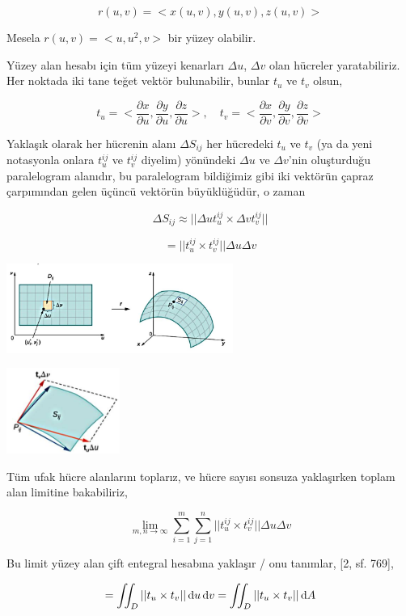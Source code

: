 \documentclass[12pt,fleqn]{article}\usepackage{../../common}
\begin{document}
$$
r(u,v) = < x(u,v), y(u,v), z(u,v) >
$$

Mesela $r(u,v) = < u, u^2, v >$ bir yüzey olabilir.

Yüzey alan hesabı için tüm yüzeyi kenarları $\Delta u$, $\Delta v$ olan hücreler
yaratabiliriz. Her noktada iki tane teğet vektör bulunabilir, bunlar $t_u$ ve
$t_v$ olsun,

$$
t_u = < \frac{\partial x}{\partial u},
        \frac{\partial y}{\partial u},
        \frac{\partial z}{\partial u} >, \quad
t_v = < \frac{\partial x}{\partial v},
        \frac{\partial y}{\partial v},
        \frac{\partial z}{\partial v} >        
$$

Yaklaşık olarak her hücrenin alanı $\Delta S_{ij}$ her hücredeki $t_u$ ve $t_v$
(ya da yeni notasyonla onlara $t_u^{ij}$ ve $t_v^{ij}$ diyelim) yönündeki
$\Delta u$ ve $\Delta v$'nin oluşturduğu paralelogram alanıdır, bu paralelogram
bildiğimiz gibi iki vektörün çapraz çarpımından gelen üçüncü vektörün
büyüklüğüdür, o zaman 

$$
\Delta S_{ij} \approx || \Delta u t_u^{ij} \times \Delta v t_v^{ij} ||
$$

$$
= ||  t_u^{ij} \times t_v^{ij} || \Delta u \Delta v
$$
        
\includegraphics[width=20em]{calc_multi_75_app_01.jpg}

\includegraphics[width=10em]{calc_multi_75_app_02.jpg}

Tüm ufak hücre alanlarını toplarız, ve hücre sayısı sonsuza yaklaşırken toplam
alan limitine bakabiliriz,

$$
\lim_{m,n \to \infty} \sum_{i=1}^{m} \sum_{j=1}^{n} || t_u^{ij} \times t_v^{ij} || \Delta u \Delta v
$$

Bu limit yüzey alan çift entegral hesabına yaklaşır / onu tanımlar, [2, sf. 769],

$$
= \iint_D || t_u \times t_v || \,\mathrm{d} u \,\mathrm{d} v = \iint_D || t_u \times t_v || \,\mathrm{d} A
$$
\end{document}
